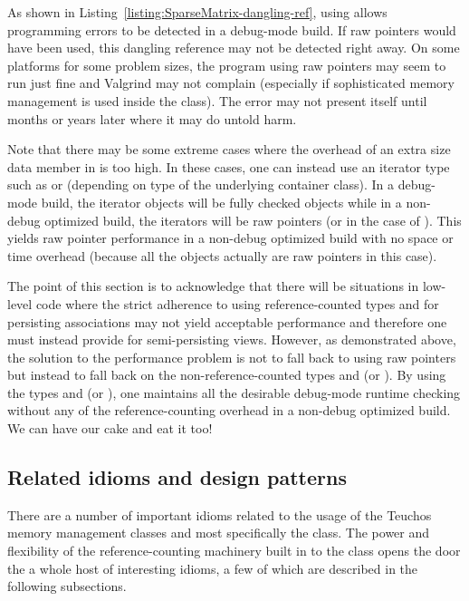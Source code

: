 \documentclass[pdf,ps2pdf,11pt]{SANDreport}
\begin{document}
As shown in Listing~\ref{listing:SparseMatrix-dangling-ref}, using
{} allows programming errors to be detected in a
debug-mode build.  If raw pointers would have been used, this dangling
reference may not be detected right away.  On some platforms for some
problem sizes, the program using raw pointers may seem to run just
fine and Valgrind may not complain (especially if sophisticated memory
management is used inside the {} class).  The error
may not present itself until months or years later where it may do
untold harm.

Note that there may be some extreme cases where the overhead of an
extra size data member in {} is too high.  In these
cases, one can instead use an iterator type such as
{} or {} (depending on
type of the underlying container class).  In a debug-mode build, the
iterator objects will be fully checked {} objects while
in a non-debug optimized build, the iterators will be raw pointers (or
{} in the case of {}).
This yields raw pointer performance in a non-debug optimized build
with no space or time overhead (because all the objects actually are
raw pointers in this case).

The point of this section is to acknowledge that there will be
situations in low-level code where the strict adherence to using
reference-counted types {} and {} for
persisting associations may not yield acceptable performance and
therefore one must instead provide for semi-persisting views.
However, as demonstrated above, the solution to the performance
problem is not to fall back to using raw pointers but instead to fall
back on the non-reference-counted types {} and
{} (or {}).  By using the
types {} and {} (or
{}), one maintains all the desirable
debug-mode runtime checking without any of the reference-counting
overhead in a non-debug optimized build.  We can have our cake and eat
it too!


%
{}\subsection{Related idioms and design patterns}
%

There are a number of important idioms related to the usage of the
Teuchos memory management classes and most specifically the
{} class.  The power and flexibility of the
reference-counting machinery built in to the {} class
opens the door the a whole host of interesting idioms, a few of which
are described in the following subsections.
\end{document}
